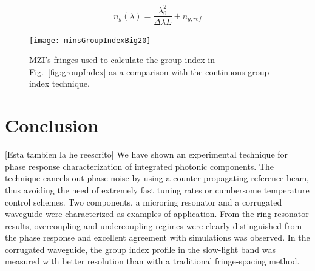 \documentclass[journal]{IEEEtran}
\begin{document}
\begin{equation}
	n_g (\lambda)=\frac{\lambda_0^2}{\Delta\lambda L} + n_{g,ref}
\end{equation}



\begin{figure}[htb]
\centering
\texttt{[image: minsGroupIndexBig20]}
\caption{MZI's fringes used to calculate the group index in Fig.~\ref{fig:groupIndex} as a comparison with the continuous group index technique.}
\label{fig:fringes}
\end{figure}

% 
% 

\section{Conclusion}
[Esta tambien la he reescrito]
We have shown an experimental technique for phase response characterization of integrated photonic components. The technique cancels out phase noise by using a counter-propagating reference beam, thus avoiding the need of extremely fast tuning rates or cumbersome temperature control schemes. Two components, a microring resonator and a corrugated waveguide were characterized as examples of application. From the ring resonator results, overcoupling and undercoupling regimes were clearly distinguished from the phase response and excellent agreement with simulations was observed. In the corrugated waveguide, the group index profile in the slow-light band was measured with better resolution than with a traditional fringe-spacing method.
\end{document}
